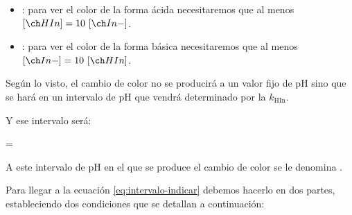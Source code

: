 \begin{itemize}
    \item {}: para ver el color de la forma ácida necesitaremos que al menos \(\conc{HIn} = 10\ \conc{In-}\).
    \item {}: para ver el color de la forma básica necesitaremos que al menos \(\conc{In-} = 10\ \conc{HIn}\).
\end{itemize}

Según lo visto, el cambio de color no se producirá a un valor fijo de pH sino que se hará en un intervalo de pH que vendrá determinado por la \(k_{\text{HIn}}\).

Y ese intervalo será:
\begin{centeredequation}
     =  \label{eq:intervalo-indicar}
\end{centeredequation}

A este intervalo de pH en el que se produce el cambio de color se le denomina .


Para llegar a la ecuación \eqref{eq:intervalo-indicar} debemos hacerlo en dos partes, estableciendo dos condiciones que se detallan a continuación:

